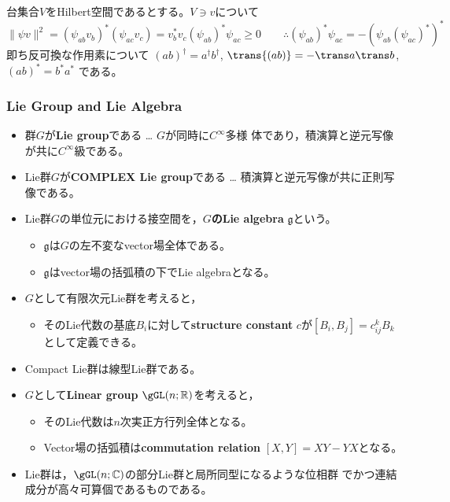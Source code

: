 台集合$V$をHilbert空間であるとする。$V\ni v$について
\begin{equation}
 \|\psi v\|^2=(\psi_{ab}v_b)^*(\psi_{ac}v_c) = v_b^*v_c(\psi_{ab})^*\psi_{ac}\ge 0
\qquad\therefore
(\psi_{ab})^*\psi_{ac}
 = -\left(\psi_{ab}(\psi_{ac})^*\right)^*
\end{equation}
即ち反可換な作用素について
$(ab)^\dagger = a^\dagger b^\dagger$,
$\trans{(ab)} = -\trans a \trans b$,
$(ab)^* = b^*a^*$ である。



\subsubsection{Lie Group and Lie Algebra}
\begin{itemize}
 \item 群$G$が{\bf Lie group}である … $G$が同時に$C^\infty$多様
       体であり，積演算と逆元写像が共に$C^\infty$級である。
 \item Lie群$G$が{\bf COMPLEX Lie group}である … 積演算と逆元写像が共に正則写像である。
\end{itemize}
\begin{itemize}
 \item Lie群$G$の単位元における接空間を，{\bf $G$のLie algebra}
       $\mathfrak g$という。
\begin{itemize}
 \item $\mathfrak g$は$G$の左不変なvector場全体である。
 \item $\mathfrak g$はvector場の括弧積の下でLie algebraとなる。
\end{itemize}
 \item $G$として有限次元Lie群を考えると，
\begin{itemize}
 \item そのLie代数の基底$B_i$に対して{\bf structure
       constant} $c$が$[B_i,B_j]=c^{k}_{ij}B_k$として定義できる。
\end{itemize}
\end{itemize}
\starline
\begin{itemize}
 \item Compact Lie群は線型Lie群である。
 \item $G$として{\bf Linear group} $\gGL(n;\Real)$を考えると，
 \begin{itemize}
  \item そのLie代数は$n$次実正方行列全体となる。
  \item Vector場の括弧積は{\bf commutation relation} $[X,Y]=XY-YX$となる。
 \end{itemize}
 \item Lie群は，$\gGL(n;\Complex)$の部分Lie群と局所同型になるような位相群
       でかつ連結成分が高々可算個であるものである。
\end{itemize}

